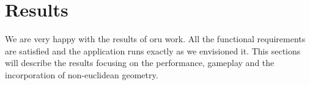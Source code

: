 \chapter{Results}\label{ch:results}
We are very happy with the results of oru work.
All the functional requirements are satisfied and the application runs exactly as we envisioned it.
This sections will describe the results focusing on the performance, gameplay and the incorporation of non-euclidean geometry.



